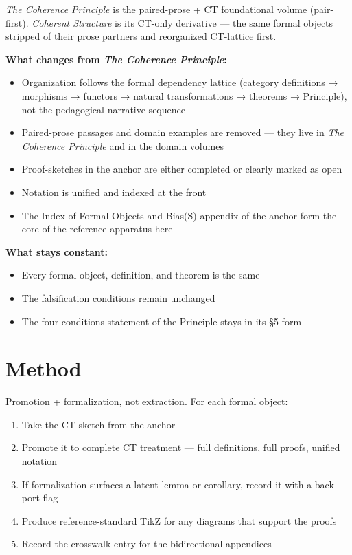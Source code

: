 \documentclass[11pt, openany]{book}
\newcommand{\sectionbreak}{\clearpage}
\begin{document}
\textit{The Coherence Principle} is the paired-prose + CT foundational volume (pair-first). \textit{Coherent Structure} is its CT-only derivative --- the same formal objects stripped of their prose partners and reorganized CT-lattice first.

\textbf{What changes from \textit{The Coherence Principle}:}

\begin{itemize}
\item Organization follows the formal dependency lattice (category definitions → morphisms → functors → natural transformations → theorems → Principle), not the pedagogical narrative sequence
\item Paired-prose passages and domain examples are removed --- they live in \textit{The Coherence Principle} and in the domain volumes
\item Proof-sketches in the anchor are either completed or clearly marked as open
\item Notation is unified and indexed at the front
\item The Index of Formal Objects and Bias(S) appendix of the anchor form the core of the reference apparatus here
\end{itemize}

\textbf{What stays constant:}

\begin{itemize}
\item Every formal object, definition, and theorem is the same
\item The falsification conditions remain unchanged
\item The four-conditions statement of the Principle stays in its §5 form
\end{itemize}

\sectionbreak

\section{Method}

Promotion + formalization, not extraction. For each formal object:

\begin{enumerate}
\item Take the CT sketch from the anchor
\item Promote it to complete CT treatment --- full definitions, full proofs, unified notation
\item If formalization surfaces a latent lemma or corollary, record it with a back-port flag
\item Produce reference-standard TikZ for any diagrams that support the proofs
\item Record the crosswalk entry for the bidirectional appendices
\end{enumerate}
\end{document}
